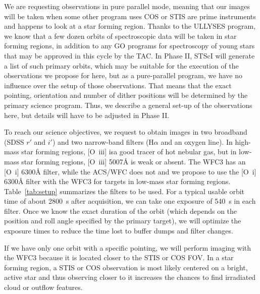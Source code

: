 \documentclass[12pt]{article}
\begin{document}

%
%
\describeobservations   %
We are requesting observations in pure parallel mode, meaning that our images will be taken when some other program uses COS or STIS are prime instruments and happens to look at a star forming region. Thanks to the ULLYSES program, we know that a few dozen orbits of spectroscopic data will be taken in star forming regions, in addition to any GO programs for spectroscopy of young stars that may be approved in this cycle by the TAC. In Phase II, STScI will generate a list of such primary orbits, which may be suitable for the execution of the observations we propose for here, but as a pure-parallel program, we have no influence over the setup of those observations. That means that the exact pointing, orientation and number of dither positions will be determined by the primary science program. Thus, we describe a general set-up of the observations here, but details will have to be adjusted in Phase II.

To reach our science objectives, we request to obtain images in two broadband (SDSS $r'$ and $i'$) and two narrow-band filters (H$\alpha$ and an oxygen line). In high-mass star forming regions, [O~{\sc iii}] isa good tracer of hot nebular gas, but in low-mass star forming regions, [O~{\sc iii}] 5007\AA{} is weak or absent. The WFC3 has an [O~{\sc i}] 6300\AA{} filter, while the ACS/WFC does not and we propose to use the [O~{\sc i}] 6300\AA{} filter with the WFC3 for targets in low-mass star forming regions. Table~\ref{tab:setup} summarizes the filters to be used.
For a typical usable orbit time of about 2800~s after acquisition, we can take one exposure of 540~s in each filter. Once we know the exact duration of the orbit (which depends on the position and roll angle specified by the primary target), we will optimize the exposure times to reduce the time lost to buffer dumps and filter changes.

If we have only one orbit with a specific pointing, we will perform imaging with the WFC3 because it is located closer to the STIS or COS FOV. In a star forming region, a STIS or COS observation is most likely centered on a bright, active star and thus observing closer to it increases the chances to find irradiated cloud or outflow features. 
\end{document}
